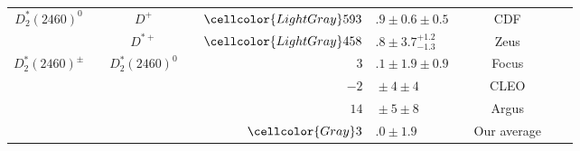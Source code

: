 {\begin{tabular}{cp{5pt}cp{5pt}r@{}lp{5pt}cp{5pt}c}
		\multirow{2}{*}{$D_{2}^{*}(2460)^{0}$}          &   & $D^{+}$                                      & \cellcolor{LightGray} & $	\cellcolor{LightGray}593$  & \cellcolor{LightGray}$.9\pm0.6\pm0.5	$         & \cellcolor{LightGray} & \cellcolor{LightGray}CDF      & \cellcolor{LightGray} & \cite{Abulencia:2005ry} \\  \cmidrule{3-9}
		                                                &   & $D^{*+}$                                     & \cellcolor{LightGray} & $	\cellcolor{LightGray} 458$ & \cellcolor{LightGray}$.8\pm3.7^{+1.2}_{-1.3}	$ & \cellcolor{LightGray} & \cellcolor{LightGray} Zeus    & \cellcolor{LightGray} & \cite{Chekanov:2008ac}  \\ \midrule
		\multirow{4}{*}[-2pt]{$D_{2}^{*}(2460)^{\pm}$}  &   & \multirow{4}{*}[-2pt]{$D_{2}^{*}(2460)^{0}$} &                       & $	3$                         & $.1\pm1.9\pm0.9	$                              &                       & Focus                         &                       & \cite{Link:2003bd}      \\
		                                                &   &                                              &                       & $-2$                         & ${}\pm4\pm4	$                                  &                       & CLEO                          &                       & \cite{Bergfeld:1994af}  \\
		                                                &   &                                              &                       & $	14$                        & ${}\pm5\pm8	$                                  &                       & Argus                         &                       & \cite{Albrecht:1989gb}  \\ \cmidrule{4-9}
		                                                &   &                                              & \cellcolor{Gray}      & $	\cellcolor{Gray}  3$       & \cellcolor{Gray}$.0 \pm 1.9	$                  & \cellcolor{Gray}      & \cellcolor{Gray} Our average  & \cellcolor{Gray}      &                         \\ \midrule
													

\end{tabular}}
